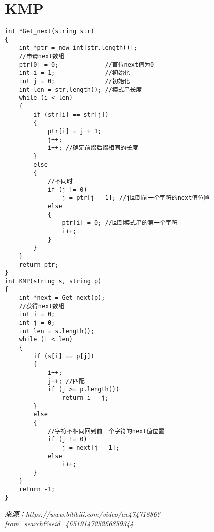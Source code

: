 \section{KMP}
\begin{lstlisting}
int *Get_next(string str)
{
    int *ptr = new int[str.length()];
    //申请next数组
    ptr[0] = 0;             //首位next值为0
    int i = 1;              //初始化
    int j = 0;              //初始化
    int len = str.length(); //模式串长度
    while (i < len)
    {
        if (str[i] == str[j])
        {
            ptr[i] = j + 1;
            j++;
            i++; //确定前缀后缀相同的长度
        }
        else
        {
            //不同时
            if (j != 0)
                j = ptr[j - 1]; //j回到前一个字符的next值位置
            else
            {
                ptr[i] = 0; //回到模式串的第一个字符
                i++;
            }
        }
    }
    return ptr;
}
int KMP(string s, string p)
{
    int *next = Get_next(p);
    //获得next数组
    int i = 0;
    int j = 0;
    int len = s.length();
    while (i < len)
    {
        if (s[i] == p[j])
        {
            i++;
            j++; //匹配
            if (j >= p.length())
                return i - j;
        }
        else
        {
            //字符不相同回到前一个字符的next值位置
            if (j != 0)
                j = next[j - 1];
            else
                i++;
        }
    }
    return -1;
}
\end{lstlisting}
\emph{来源：https://www.bilibili.com/video/av47471886?from=search\&seid=4651914725266859344}